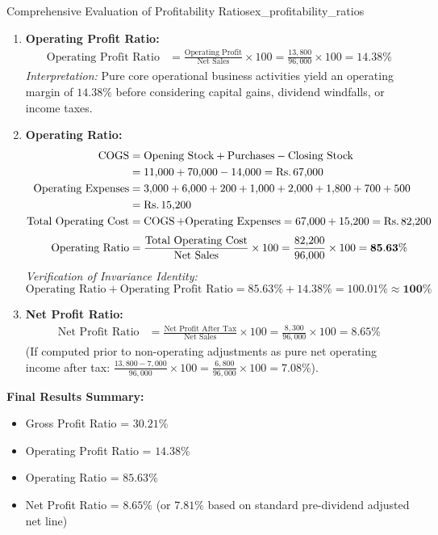 \begin{example}{Comprehensive Evaluation of Profitability Ratios}{ex_profitability_ratios}
\begin{enumerate}[leftmargin=*]
    \item \textbf{Operating Profit Ratio:}
    \begin{align*}
        \text{Operating Profit Ratio} &= \frac{\text{Operating Profit}}{\text{Net Sales}} \times 100 = \frac{13{,}800}{96{,}000} \times 100 = \mathbf{14.38\%}
    \end{align*}
    \textit{Interpretation:} Pure core operational business activities yield an operating margin of $14.38\%$ before considering capital gains, dividend windfalls, or income taxes.

    \item \textbf{Operating Ratio:}
    \begin{align*}
        \operatorname{COGS} &= \text{Opening Stock} + \text{Purchases} - \text{Closing Stock} \\
              &= 11{,}000 + 70{,}000 - 14{,}000 = \text{Rs.}\, 67{,}000 \\
        \text{Operating Expenses} &= 3{,}000 + 6{,}000 + 200 + 1{,}000 + 2{,}000 + 1{,}800 + 700 + 500 \\
                                  &= \text{Rs.}\, 15{,}200 \\
        \text{Total Operating Cost} &= \operatorname{COGS} + \text{Operating Expenses} = 67{,}000 + 15{,}200 = \text{Rs.}\, 82{,}200 \\[0.3em]
        \text{Operating Ratio} &= \frac{\text{Total Operating Cost}}{\text{Net Sales}} \times 100 = \frac{82{,}200}{96{,}000} \times 100 = \mathbf{85.63\%}
    \end{align*}
    \textit{Verification of Invariance Identity:}
    \begin{equation*}
        \text{Operating Ratio} + \text{Operating Profit Ratio} = 85.63\% + 14.38\% = \mathbf{100.01\% \approx 100\%}
    \end{equation*}

    \item \textbf{Net Profit Ratio:}
    \begin{align*}
        \text{Net Profit Ratio} &= \frac{\text{Net Profit After Tax}}{\text{Net Sales}} \times 100 = \frac{8{,}300}{96{,}000} \times 100 = \mathbf{8.65\%}
    \end{align*}
    (If computed prior to non-operating adjustments as pure net operating income after tax: $\frac{13,800 - 7,000}{96,000} \times 100 = \frac{6,800}{96,000} \times 100 = 7.08\%$).
\end{enumerate}

\textbf{Final Results Summary:}
\begin{itemize}[noitemsep]
    \item Gross Profit Ratio = $\mathbf{30.21\%}$
    \item Operating Profit Ratio = $\mathbf{14.38\%}$
    \item Operating Ratio = $\mathbf{85.63\%}$
    \item Net Profit Ratio = $\mathbf{8.65\%}$ (or $\mathbf{7.81\%}$ based on standard pre-dividend adjusted net line)
\end{itemize}
\end{example}

